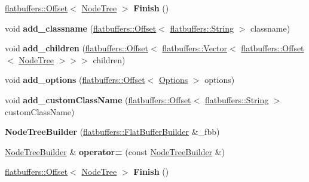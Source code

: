 \begin{DoxyCompactItemize}
\item 
\mbox{\label{structflatbuffers_1_1NodeTreeBuilder_a29d4c969fac0078fb29f281043b14658}} 
\hyperlink{structflatbuffers_1_1Offset}{flatbuffers\+::\+Offset}$<$ \hyperlink{structflatbuffers_1_1NodeTree}{Node\+Tree} $>$ {\bfseries Finish} ()
\item 
\mbox{\label{structflatbuffers_1_1NodeTreeBuilder_aee2ad62a8758081ebee7d8594ba13975}} 
void {\bfseries add\+\_\+classname} (\hyperlink{structflatbuffers_1_1Offset}{flatbuffers\+::\+Offset}$<$ \hyperlink{structflatbuffers_1_1String}{flatbuffers\+::\+String} $>$ classname)
\item 
\mbox{\label{structflatbuffers_1_1NodeTreeBuilder_ae833713a2c701f9df28c6ce431caec3b}} 
void {\bfseries add\+\_\+children} (\hyperlink{structflatbuffers_1_1Offset}{flatbuffers\+::\+Offset}$<$ \hyperlink{classflatbuffers_1_1Vector}{flatbuffers\+::\+Vector}$<$ \hyperlink{structflatbuffers_1_1Offset}{flatbuffers\+::\+Offset}$<$ \hyperlink{structflatbuffers_1_1NodeTree}{Node\+Tree} $>$$>$$>$ children)
\item 
\mbox{\label{structflatbuffers_1_1NodeTreeBuilder_a4aa012f12973655566365e946da362fc}} 
void {\bfseries add\+\_\+options} (\hyperlink{structflatbuffers_1_1Offset}{flatbuffers\+::\+Offset}$<$ \hyperlink{structflatbuffers_1_1Options}{Options} $>$ options)
\item 
\mbox{\label{structflatbuffers_1_1NodeTreeBuilder_a7e54e2e8b958528b9c18ce46c2a29786}} 
void {\bfseries add\+\_\+custom\+Class\+Name} (\hyperlink{structflatbuffers_1_1Offset}{flatbuffers\+::\+Offset}$<$ \hyperlink{structflatbuffers_1_1String}{flatbuffers\+::\+String} $>$ custom\+Class\+Name)
\item 
\mbox{\label{structflatbuffers_1_1NodeTreeBuilder_a01676b4a1e79f03bbbb794cef1b98f65}} 
{\bfseries Node\+Tree\+Builder} (\hyperlink{classflatbuffers_1_1FlatBufferBuilder}{flatbuffers\+::\+Flat\+Buffer\+Builder} \&\+\_\+fbb)
\item 
\mbox{\label{structflatbuffers_1_1NodeTreeBuilder_aaf5f21a6a6a237d4dd6dadffa7a60b8c}} 
\hyperlink{structflatbuffers_1_1NodeTreeBuilder}{Node\+Tree\+Builder} \& {\bfseries operator=} (const \hyperlink{structflatbuffers_1_1NodeTreeBuilder}{Node\+Tree\+Builder} \&)
\item 
\mbox{\label{structflatbuffers_1_1NodeTreeBuilder_a29d4c969fac0078fb29f281043b14658}} 
\hyperlink{structflatbuffers_1_1Offset}{flatbuffers\+::\+Offset}$<$ \hyperlink{structflatbuffers_1_1NodeTree}{Node\+Tree} $>$ {\bfseries Finish} ()
\end{DoxyCompactItemize}
